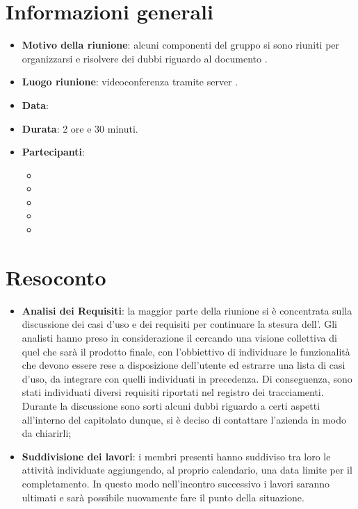 \section{Informazioni generali}
\begin{itemize}
\item \textbf{Motivo della riunione}: alcuni componenti del gruppo si sono riuniti per organizzarsi e risolvere dei dubbi riguardo al documento \AdR.
\item \textbf{Luogo riunione}: videoconferenza tramite server .
\item \textbf{Data}: \Data{}
\item \textbf{Durata}: 2 ore e 30 minuti.
\item \textbf{Partecipanti}:
	\begin{itemize}
	\item \BM{}
	\item \SG{}
	\item \SP{}
	\item \SH{}
	\item \PA{}
	\end{itemize}
\end{itemize}
\newpage
\section{Resoconto}
\begin{itemize}
\item \textbf{Analisi dei Requisiti}: la maggior parte della riunione si è concentrata sulla discussione dei casi d'uso e dei requisiti per continuare la stesura dell'\AdRv{}.
Gli analisti hanno preso in considerazione il  cercando una visione collettiva di quel che sarà il prodotto finale, con l'obbiettivo di individuare le funzionalità che devono essere rese a disposizione dell'utente ed estrarre una lista di casi d'uso, da integrare con quelli individuati in precedenza. Di conseguenza, sono stati individuati diversi requisiti riportati nel registro dei tracciamenti.\\
Durante la discussione sono sorti alcuni dubbi riguardo a certi aspetti all'interno del capitolato dunque, si è deciso di contattare l'azienda in modo da chiarirli;

\item \textbf{Suddivisione dei lavori}: i membri presenti hanno suddiviso tra loro le attività individuate aggiungendo, al proprio calendario, una data limite per il completamento. In questo modo nell'incontro successivo i lavori saranno ultimati e sarà possibile nuovamente fare il punto della situazione.

\end{itemize}

 